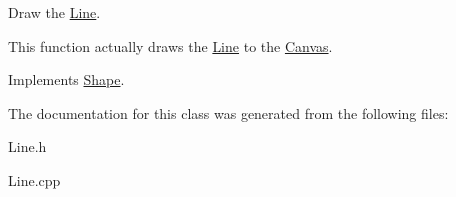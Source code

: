 Draw the \hyperlink{class_line}{Line}. 

This function actually draws the \hyperlink{class_line}{Line} to the \hyperlink{class_canvas}{Canvas}. 

Implements \hyperlink{class_shape_afacc5aad8e37308c3ce8fef768199b05}{Shape}.



The documentation for this class was generated from the following files\+:\begin{DoxyCompactItemize}
\item 
Line.\+h\item 
Line.\+cpp\end{DoxyCompactItemize}
